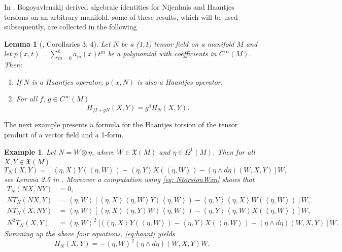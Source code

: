 \documentclass[12pt]{article}
\newtheorem{lem}[theorem]{Lemma}
\newtheorem{example}[theorem]{Example}
\begin{document}
In \cite{BogoTens}, Bogoyavlenskij derived algebraic identities for Nijenhuis and Haantjes torsions on an arbitrary manifold. some of these results, which will be used subsequently, are collected in the following
\begin{lem}[\cite{BogoTens}, Corollaries 3, 4]\label{lem:Bogo}
Let  $N$ be a (1,1) tensor field on a %
manifold $M$ and let $p(x,t)=\sum_{m=0}^ka_m(x)t^m$ be a polynomial with coefficients in $C^\infty(M)$.  Then: %
\begin{enumerate}
\item If $N$ is a Haantjes operator, $p(x,N)$ is also a Haantjes operator.
\item For all $f,\,g\in C^{\infty}(M)$
\begin{equation}
H_{fI+gN}(X,Y)=g^4H_{N}(X,Y).\label{eq: Haantjes_defor_I}
\end{equation}
\end{enumerate}
\end{lem}
The next example presents a formula for the Haantjes torsion of %
the tensor product of a vector field and a 1-form.
\begin{example} 
Let $N=W\otimes\eta$, where $W\in\mathfrak{X}(M)$ and $\eta\in\Omega^{1}(M)$. Then for all $X,Y\in\mathfrak{X}(M)$
\begin{equation}
T_{N}(X,Y)=\left[\left<\eta,X\right>Y(\left<\eta,W\right>)-\left<\eta,Y\right>X(\left<\eta,W\right>)-(\eta\wedge d\eta)(W,X,Y)\right]W,\label{eq: NtorsionWxn}
\end{equation}
see Lemma 2.5 in \cite{Cheng-Sheng}.
Moreover a computation using \eqref{eq: NtorsionWxn} shows that
\begin{align*}
T_N(NX,NY)&=0,\\
NT_N(NX,Y)&=\left<\eta,W\right>\left[\left<\eta,X\right>\left<\eta,W\right>Y(\left<\eta,W\right>)-\left<\eta,Y\right>\left<\eta,X\right>W(\left<\eta,W\right>)\right]W,\\
NT_N(X,NY)&=\left<\eta,W\right>\left[\left<\eta,X\right>\left<\eta,Y\right>W(\left<\eta,W\right>)-\left<\eta,Y\right>\left<\eta,W\right>X(\left<\eta,W\right>)\right]W,\\
N^2T_N(X,Y)&=\left<\eta,W\right>^2\left[(\left<\eta,X\right>Y(\left<\eta,W\right>)-\left<\eta,Y\right>X(\left<\eta,W\right>)-(\eta\wedge d\eta)(W,X,Y)\right]W.
\end{align*}
Summing up the above four equations, \eqref{eq:haant} yields
\begin{equation}\label{eq: HtorsionWxn}
H_{N}(X,Y)=-\left<\eta,W\right>^2(\eta\wedge d\eta)(W,X,Y)W.
\end{equation}
\end{example}
\end{document}
